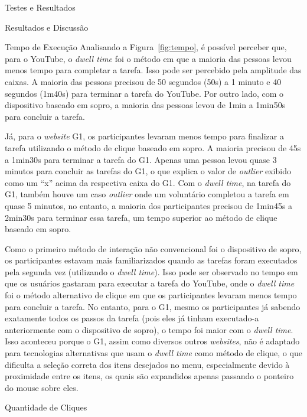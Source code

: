 \begin{chapter}{Testes e Resultados}
\begin{section}{Resultados e Discussão}
\begin{subsection}{Tempo de Execução}
\vspace{-0.5cm}
Analisando a Figura~\ref{fig:tempo}, é possível perceber que, para o YouTube, o
\textit{dwell time} foi o método em que a maioria das pessoas levou menos tempo
para completar a tarefa. Isso pode ser percebido pela amplitude das caixas.
A maioria das pessoas precisou de 50 segundos (50s) a 1 minuto e 40 segundos
(1m40s) para terminar a tarefa do YouTube. Por outro lado, com o dispositivo
baseado em sopro, a maioria das pessoas levou de 1min a 1min50s para concluir a
tarefa.

Já, para o \textit{website} G1, os participantes levaram menos tempo
para finalizar a tarefa utilizando o método de clique baseado em sopro.
A maioria precisou de 45s a 1min30s para terminar a tarefa do G1. Apenas uma
pessoa levou quase 3 minutos para concluir as tarefas do G1, o que explica o
valor de \textit{outlier} exibido como um ``x'' acima da respectiva caixa do
G1. Com o \textit{dwell time}, na tarefa do G1, também houve um caso
\textit{outlier} onde um voluntário completou a tarefa em quase 5 minutos, no
entanto, a maioria dos participantes precisou de 1min45s a 2min30s para terminar
essa tarefa, um tempo superior ao método de clique baseado em sopro.

Como o primeiro método de interação não convencional foi o dispositivo de sopro,
os participantes estavam mais familiarizados quando as tarefas foram executados
pela segunda vez (utilizando o \textit{dwell time}). Isso pode ser observado no
tempo em que os usuários gastaram para executar a tarefa do YouTube, onde o
\textit{dwell time} foi o método alternativo de clique em que  os participantes
levaram menos tempo para concluir a tarefa. No entanto, para o G1, mesmo os
participantes já sabendo exatamente todos os passos da tarefa (pois eles já
tinham executado-a anteriormente com o dispositivo de sopro), o tempo foi maior
com o \textit{dwell time}. Isso aconteceu porque o G1, assim como diversos
outros \textit{websites}, não é adaptado para tecnologias alternativas que usam
o \textit{dwell time} como método de clique, o que dificulta a seleção
correta dos itens desejados no menu, especialmente devido à proximidade entre os
itens, os quais são expandidos apenas passando o ponteiro do mouse sobre eles.

\end{subsection}

\begin{subsection}{Quantidade de Cliques}


\end{subsection}
\end{section}
\end{chapter}
